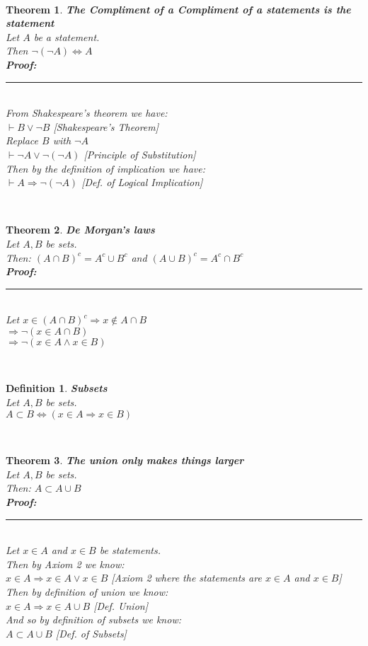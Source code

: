 \documentclass[12pt]{extarticle}
\theoremstyle{plain}
\newtheorem{thm}{Theorem}[section]
\theoremstyle{plain}
\theoremstyle{plain}
\theoremstyle{Definition}
\newtheorem{def.}{Definition}[section]
\theoremstyle{Definition}
\theoremstyle{plain}
\newcommand{\cut}[0]{\noindent\framebox[\linewidth]{\rule{\linewidth}{2pt}}\\}
\newcommand{\prof}[0]{	\noindent \textbf{Proof:} \rule{500pt}{2pt} \\ }
\begin{document}
\cut
\begin{thm} \textbf{The Compliment of a Compliment of a statements is the statement} \\
	Let $A$ be a statement. \\ 
	Then $\lnot(\lnot A) \Leftrightarrow A$ \\
	\prof 
	From Shakespeare's theorem we have: \\ 
	$\vdash B \lor \lnot B$ \hfill [Shakespeare's Theorem] \\ 
	Replace $B$ with $\lnot A$ \\ 
	$\vdash \lnot A \lor \lnot (\lnot A)$ \hfill [Principle of Substitution]\\ 
	Then by the definition of implication we have: \\ 
	$\vdash A \Rightarrow \lnot (\lnot A)$ \hfill [Def. of Logical Implication] \\
\end{thm}
\cut
\begin{thm} \textbf{De Morgan's laws} \\
	Let $A,B$ be sets. \\ 
	Then: $(A \cap B)^c = A^c \cup B^c$ and $(A \cup B)^c = A^c \cap B^c$ \\ 
	\prof 
	Let $x \in (A \cap B)^c \Rightarrow x \not \in A \cap B$ \\ 
	$\Rightarrow \lnot(x \in A \cap B)$ \\ 
	$\Rightarrow \lnot(x \in A \land x \in B)$  
\end{thm}
\cut
\begin{def.} \textbf{Subsets} \\ 
	Let $A,B$ be sets. \\ 
	$A \subset B \Leftrightarrow (x \in A \Rightarrow x \in B)$
\end{def.}
\cut
\begin{thm} \textbf{The union only makes things larger} \\
	Let $A,B$ be sets. \\ 
	Then: $A \subset A \cup B$ \\ 
	\prof 
	Let $x \in A$ and $x\in B$ be statements. \\
	Then by Axiom 2 we know: \\ 
	$x \in A \Rightarrow x \in A \lor x \in B$ \hfill [Axiom 2 where the statements are $x \in A$ and $x \in B$] \\ 
	Then by definition of union we know: \\ 
	$x \in A \Rightarrow x \in A \cup B$ \hfill [Def. Union] \\
	And so by definition of subsets we know: \\ 
	$A \subset A \cup B$ \hfill [Def. of Subsets] \\
\end{thm}
\end{document}
